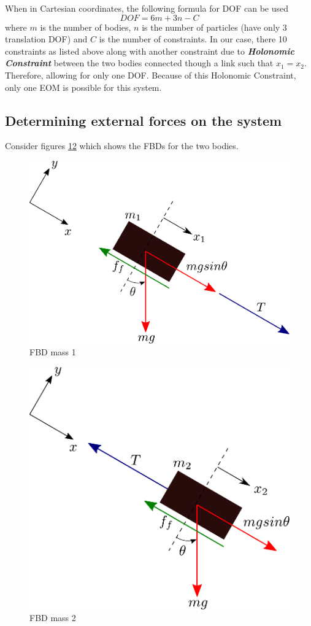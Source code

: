 When in Cartesian coordinates, the following formula for DOF can be used
\begin{equation}
	DOF = 6m + 3n - C
\end{equation}
where $m$ is the number of bodies, $n$ is the number of particles (have only 3 translation DOF) and $C$ is the number of constraints. In our case, there 10 constraints as listed above along with another constraint due to \textbf{\textit{Holonomic Constraint}} between the two bodies connected though a link such that $x_{1} = x_{2}$. Therefore, allowing for only one DOF. Because of this Holonomic Constraint, only one EOM is possible for this system.

\subsection{Determining external forces on the system}

Consider figures \ref{Fig_0_ch_4_Ex3_FBD1}\ref{Fig_0_ch_4_Ex3_FBD2} which shows the FBDs for the two bodies.
\newpage
\begin{figure}[h!]
	\centering
	\includegraphics[width=0.5\linewidth]{Bilder/19_TwoMassesRodProblem_FBD_M1.pdf}
	\caption{FBD mass 1}
	\label{Fig_0_ch_4_Ex3_FBD1}
\end{figure}
\begin{figure}[h!]
	\centering
	\includegraphics[width=0.5\linewidth]{Bilder/19_TwoMassesRodProblem_FBD_M2.pdf}
	\caption{FBD mass 2}
	\label{Fig_0_ch_4_Ex3_FBD2}
\end{figure}

